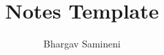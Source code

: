 \documentclass[11pt]{article}
\title{Notes Template}
\author{
	Bhargav Samineni
}
\date{}
\begin{document}
\maketitle

\begin{abstract}
	\lipsum[2]
\end{abstract}



\newpage


\end{document}
